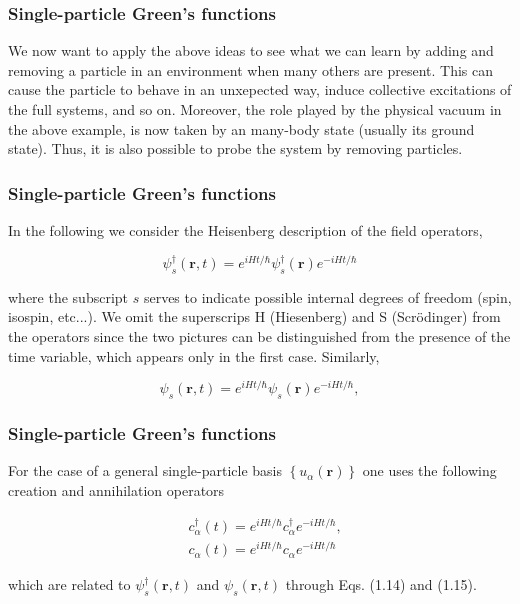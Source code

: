 \documentclass[compress]{beamer}
\begin{document}
\frame
{
\frametitle{Single-particle Green's functions}
\begin{small}
{\scriptsize
We now want to apply the above ideas to see what we can learn by
adding and removing a particle in an environment when many others are
present. This can cause the particle to behave in an unxepected way,
induce collective excitations of the full systems, and so
on. Moreover, the role played by the physical vacuum in the above
example, is now taken by an many-body state (usually its ground
state). Thus, it is also possible to probe the system by removing
particles.

}
\end{small}
}


\frame
{
\frametitle{Single-particle Green's functions}
\begin{small}
{\scriptsize
In the following we consider the Heisenberg description of the field operators,

$$
\psi_{s}^{\dagger}(\mathbf{r}, t)=e^{i H t / \hbar} \psi_{s}^{\dagger}(\mathbf{r}) e^{-i H t / \hbar}
$$

where the subscript $s$ serves to indicate possible internal degrees of freedom (spin, isospin, etc...). We omit the superscrips $\mathrm{H}$ (Hiesenberg) and S (Scrödinger) from the operators since the two pictures can be distinguished from the presence of the time variable, which appears only in the first case. Similarly,

$$
\psi_{s}(\mathbf{r}, t)=e^{i H t / \hbar} \psi_{s}(\mathbf{r}) e^{-i H t / \hbar},
$$

}
\end{small}
}


\frame
{
\frametitle{Single-particle Green's functions}
\begin{small}
{\scriptsize
For the case of a general single-particle basis $\left\{u_{\alpha}(\mathbf{r})\right\}$ one uses the following creation and annihilation operators

$$
\begin{aligned}
& c_{\alpha}^{\dagger}(t)=e^{i H t / \hbar} c_{\alpha}^{\dagger} e^{-i H t / \hbar}, \\
& c_{\alpha}(t)=e^{i H t / \hbar} c_{\alpha} e^{-i H t / \hbar}
\end{aligned}
$$

which are related to $\psi_{s}^{\dagger}(\mathbf{r}, t)$ and $\psi_{s}(\mathbf{r}, t)$ through Eqs. (1.14) and (1.15).

}
\end{small}
}
\end{document}
